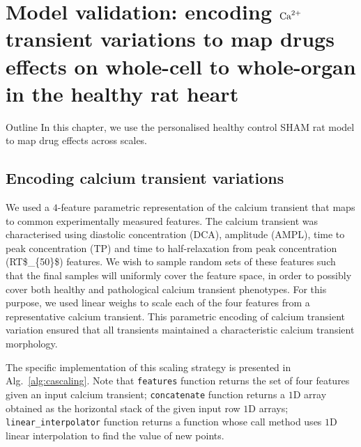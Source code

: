 \chapter{Model validation: encoding $\textrm{Ca}^{2+}$ transient variations to map drugs 
effects on whole-cell to whole-organ in the healthy rat 
heart}\label{cha:chapter6}
%
%
%
\begin{remark}{Outline}
    In this chapter, we use the personalised healthy control SHAM rat model to map drug effects across scales. 
\end{remark}


%
%
%
\section{Encoding calcium transient variations}
We used a $4$-feature parametric representation of the calcium transient that maps to common experimentally measured features. The calcium transient was characterised using diastolic concentration (\acs{DCA}), amplitude (\acs{AMPL}), time to peak concentration (\acs{TP}) and time to half-relaxation from peak concentration (\acs{RT$_{50}$}) features. We wish to sample random sets of these features such that the final samples will uniformly cover the feature space, in order to possibly cover both healthy and pathological calcium transient phenotypes. For this purpose, we used linear weighs to scale each of the four features from a representative calcium transient. This parametric encoding of calcium transient variation ensured that all transients maintained a characteristic calcium transient morphology.

\vspace{0.2cm}
The specific implementation of this scaling strategy is presented in Alg.~\ref{alg:cascaling}. Note that \texttt{features} function returns the set of four features given an input calcium transient; \texttt{concatenate} function returns a $1$D array obtained as the horizontal stack of the given input row $1$D arrays; \texttt{linear\_interpolator} function returns a function whose call method uses $1$D linear interpolation to find the value of new points.

